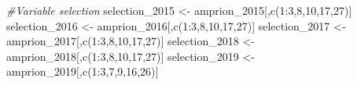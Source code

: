 \documentclass[a4paper,11pt]{article}
\newenvironment{Shaded}{\begin{snugshade}}{\end{snugshade}}
\newcommand{\CommentTok}[1]{\textcolor[rgb]{0.56,0.35,0.01}{\textit{#1}}}
\newcommand{\DecValTok}[1]{\textcolor[rgb]{0.00,0.00,0.81}{#1}}
\newcommand{\FunctionTok}[1]{\textcolor[rgb]{0.00,0.00,0.00}{#1}}
\newcommand{\NormalTok}[1]{#1}
\newcommand{\OtherTok}[1]{\textcolor[rgb]{0.56,0.35,0.01}{#1}}
\newcommand{\SpecialCharTok}[1]{\textcolor[rgb]{0.00,0.00,0.00}{#1}}
\begin{document}
\begin{Shaded}
\begin{Highlighting}[]
\CommentTok{\#Variable selection}
\NormalTok{selection\_2015 }\OtherTok{\textless{}{-}}\NormalTok{ amprion\_2015[,}\FunctionTok{c}\NormalTok{(}\DecValTok{1}\SpecialCharTok{:}\DecValTok{3}\NormalTok{,}\DecValTok{8}\NormalTok{,}\DecValTok{10}\NormalTok{,}\DecValTok{17}\NormalTok{,}\DecValTok{27}\NormalTok{)]}
\NormalTok{selection\_2016 }\OtherTok{\textless{}{-}}\NormalTok{ amprion\_2016[,}\FunctionTok{c}\NormalTok{(}\DecValTok{1}\SpecialCharTok{:}\DecValTok{3}\NormalTok{,}\DecValTok{8}\NormalTok{,}\DecValTok{10}\NormalTok{,}\DecValTok{17}\NormalTok{,}\DecValTok{27}\NormalTok{)]}
\NormalTok{selection\_2017 }\OtherTok{\textless{}{-}}\NormalTok{ amprion\_2017[,}\FunctionTok{c}\NormalTok{(}\DecValTok{1}\SpecialCharTok{:}\DecValTok{3}\NormalTok{,}\DecValTok{8}\NormalTok{,}\DecValTok{10}\NormalTok{,}\DecValTok{17}\NormalTok{,}\DecValTok{27}\NormalTok{)]}
\NormalTok{selection\_2018 }\OtherTok{\textless{}{-}}\NormalTok{ amprion\_2018[,}\FunctionTok{c}\NormalTok{(}\DecValTok{1}\SpecialCharTok{:}\DecValTok{3}\NormalTok{,}\DecValTok{8}\NormalTok{,}\DecValTok{10}\NormalTok{,}\DecValTok{17}\NormalTok{,}\DecValTok{27}\NormalTok{)]}
\NormalTok{selection\_2019 }\OtherTok{\textless{}{-}}\NormalTok{ amprion\_2019[,}\FunctionTok{c}\NormalTok{(}\DecValTok{1}\SpecialCharTok{:}\DecValTok{3}\NormalTok{,}\DecValTok{7}\NormalTok{,}\DecValTok{9}\NormalTok{,}\DecValTok{16}\NormalTok{,}\DecValTok{26}\NormalTok{)]}


\end{Highlighting}
\end{Shaded}
\end{document}
